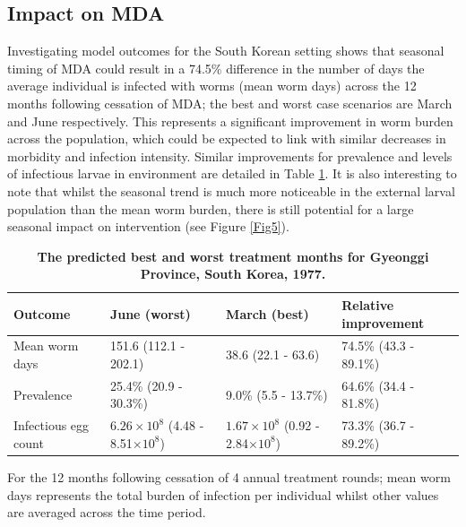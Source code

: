 \subsection{Impact on MDA}

Investigating model outcomes for the South Korean setting shows that seasonal timing of MDA could result in a 74.5\% difference in the number of days the average individual is infected with worms (mean worm days) across the 12 months following cessation of MDA; the best and worst case scenarios are March and June respectively. This represents a significant improvement in worm burden across the population, which could be expected to link with similar decreases in morbidity and infection intensity. Similar improvements for prevalence and levels of infectious larvae in environment are detailed in Table \ref{tab:outcome}. It is also interesting to note that whilst the seasonal trend is much more noticeable in the external larval population than the mean worm burden, there is still potential for a large seasonal impact on intervention (see Figure \ref{Fig5}).

\begin{table}
\centering
\caption{
{\bf The predicted best and worst treatment months for Gyeonggi Province, South Korea, 1977.}}
\begin{tabular}{|l|l|l|l|}
\hline
\multicolumn{1}{|l|}{\bf Outcome} & \multicolumn{1}{|l|}{\bf June (worst)} &
\multicolumn{1}{|l|}{\bf March (best)} &
\multicolumn{1}{|l|}{\bf Relative improvement} \\ \hline
Mean worm days & 151.6 (112.1 - 202.1) & 38.6 (22.1 - 63.6) & 74.5\% (43.3 - 89.1\%) \\ \hline
Prevalence & 25.4\% (20.9 - 30.3\%) & 9.0\% (5.5 - 13.7\%) & 64.6\% (34.4 - 81.8\%)\\ \hline
Infectious egg count & $6.26\times10^8$ (4.48 - 8.51$\times10^8$) & $1.67\times10^8$ (0.92 - 2.84$\times10^8$) & 73.3\% (36.7 - 89.2\%) \\ \hline
\end{tabular}
\label{tab:outcome}
\begin{flushleft} For the 12 months following cessation of 4 annual treatment rounds; mean worm days represents the total burden of infection per individual whilst other values are averaged across the time period.
\end{flushleft}
\end{table}


